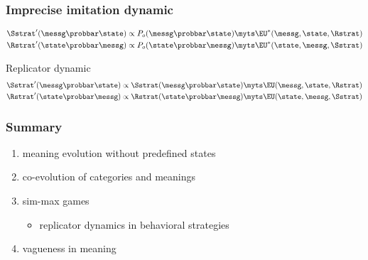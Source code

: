 \documentclass[fleqn,9pt,xcolor=dvipsnames]{beamer}
\makeatletter
\def\beamer@writeslidentry@miniframesoff{%
  \expandafter\beamer@ifempty\expandafter{\beamer@framestartpage}{}%
  {%
    \clearpage\beamer@notesactions%
  }
}
\newcommand*{\miniframesoff}{\let\beamer@writeslidentry=\beamer@writeslidentry@miniframesoff}
\makeatother
\begin{document}
\begin{frame}
  \frametitle{Imprecise imitation dynamic}
  
  \begin{align*}
  \Sstrat'(\messg \probbar \state) & \propto P_o(\messg \probbar \state) \myts \EU^*(\messg,
  \state, \Rstrat)\\ 
  \Rstrat'(\state \probbar \messg) & \propto P_o(\state \probbar \messg)
  \myts \EU^*(\state, \messg, \Sstrat)
\end{align*}

\bigskip

\begin{block}{Replicator dynamic}
  \begin{align*}
    \Sstrat'(\messg \probbar \state) & \propto \Sstrat(\messg \probbar \state) \myts
    \EU(\messg, \state,\Rstrat) \\ \Rstrat'(\state \probbar \messg) & \propto \Rstrat(\state
    \probbar \messg) \myts \EU(\state, \messg,\Sstrat)
  \end{align*}
\end{block}




\end{frame}




\miniframesoff

\begin{frame}[plain]
  \frametitle{Summary}
  
  \begin{enumerate}
  \item meaning evolution without predefined states
  \item co-evolution of categories and meanings \medskip
  \item sim-max games
    \begin{itemize}
    \item[] replicator dynamics in behavioral strategies\medskip 
    \end{itemize}
  \item vagueness in meaning
  \end{enumerate}
\end{frame}


\miniframesoff


\renewcommand*{\bibfont}{\footnotesize}

\begin{frame}[plain]
  \large{\color{mycol}{References}}
  \vspace*{-0.45cm}
  \begin{multicols}{2}
    \begin{tiny}
      \printbibliography[heading=subbibliography]
    \end{tiny}
  \end{multicols}

\end{frame}
\end{document}
